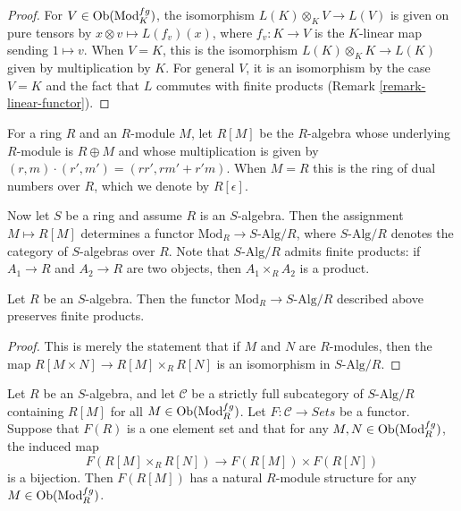 \begin{proof}
For $V \in \mathop{\mathrm{Ob}}\nolimits(\text{Mod}^{fg}_K)$, the isomorphism
$L(K) \otimes_K V \to L(V)$ is given on pure tensors by
$x \otimes v \mapsto L(f_v)(x)$, where $f_v: K \to V$ is the $K$-linear map
sending $1 \mapsto v$.  When $V = K$, this is the isomorphism
$L(K) \otimes_K K \to L(K)$ given by multiplication by $K$.
For general $V$, it is an isomorphism by the case $V = K$ and the
fact that $L$ commutes with finite
products (Remark \ref{remark-linear-functor}).
\end{proof}

\noindent
For a ring $R$ and an $R$-module $M$, let $R[M]$ be the $R$-algebra whose
underlying $R$-module is $R \oplus M$ and whose multiplication is given by
$(r, m) \cdot (r', m') = (rr', rm' + r'm)$.  When $M = R$ this is the ring of
dual numbers over $R$, which we denote by $R[\epsilon]$.

\medskip\noindent
Now let $S$ be a ring and assume $R$ is an $S$-algebra.
Then the assignment $M \mapsto R[M]$ determines a functor
$\text{Mod}_R \to S\text{-Alg}/R$, where $S\text{-Alg}/R$
denotes the category of $S$-algebras over $R$. Note that
$S\text{-Alg}/R$ admits finite products: if $A_1 \to R$ and
$A_2 \to R$ are two objects, then $A_1 \times_R A_2$ is a product.

\begin{lemma}
\label{lemma-preserves-products}
Let $R$ be an $S$-algebra. Then the functor
$\text{Mod}_R \to S\text{-Alg}/R$ described above preserves finite products.
\end{lemma}

\begin{proof}
This is merely the statement that if $M$ and $N$ are $R$-modules, then the map
$R[M \times N] \to R[M] \times_R R[N]$ is an isomorphism in
$S\text{-Alg}/R$.
\end{proof}

\begin{lemma}
\label{lemma-tangent-space-functor}
Let $R$ be an $S$-algebra, and let $\mathcal{C}$ be a strictly full
subcategory of $S\text{-Alg}/R$ containing $R[M]$ for all
$M \in \mathop{\mathrm{Ob}}\nolimits(\text{Mod}^{fg}_R)$.
Let $F: \mathcal{C} \to \textit{Sets}$ be a functor. Suppose that
$F(R)$ is a one element set and that for any $M, N \in
\mathop{\mathrm{Ob}}\nolimits(\text{Mod}^{fg}_R)$, the induced map
$$
F(R[M] \times_R R[N]) \to F(R[M]) \times F(R[N])
$$
is a bijection. Then $F(R[M])$ has a natural $R$-module structure for any $M
\in \mathop{\mathrm{Ob}}\nolimits(\text{Mod}^{fg}_R)$.
\end{lemma}

